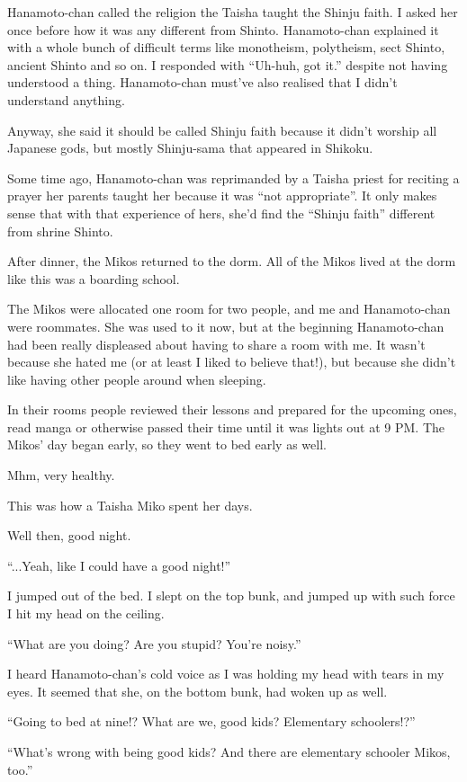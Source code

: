Hanamoto-chan called the religion the Taisha taught the Shinju faith. I asked her once before how it was any different from Shinto. Hanamoto-chan explained it with a whole bunch of difficult terms like monotheism, polytheism, sect Shinto, ancient Shinto and so on. I responded with ``Uh-huh, got it.'' despite not having understood a thing. Hanamoto-chan must've also realised that I didn't understand anything.

Anyway, she said it should be called Shinju faith because it didn't worship all Japanese gods, but mostly Shinju-sama that appeared in Shikoku.

Some time ago, Hanamoto-chan was reprimanded by a Taisha priest for reciting a prayer her parents taught her because it was ``not appropriate''. It only makes sense that with that experience of hers, she'd find the ``Shinju faith'' different from shrine Shinto.

After dinner, the Mikos returned to the dorm. All of the Mikos lived at the dorm like this was a boarding school.

The Mikos were allocated one room for two people, and me and Hanamoto-chan were roommates. She was used to it now, but at the beginning Hanamoto-chan had been really displeased about having to share a room with me. It wasn't because she hated me (or at least I liked to believe that!), but because she didn't like having other people around when sleeping.

In their rooms people reviewed their lessons and prepared for the upcoming ones, read manga or otherwise passed their time until it was lights out at 9 PM. The Mikos' day began early, so they went to bed early as well.

Mhm, very healthy.

This was how a Taisha Miko spent her days.

Well then, good night.

``...Yeah, like I could have a good night!''

I jumped out of the bed. I slept on the top bunk, and jumped up with such force I hit my head on the ceiling.

``What are you doing? Are you stupid? You're noisy.''

I heard Hanamoto-chan's cold voice as I was holding my head with tears in my eyes. It seemed that she, on the bottom bunk, had woken up as well.

``Going to bed at nine!? What are we, good kids? Elementary schoolers!?''

``What's wrong with being good kids? And there are elementary schooler Mikos, too.''

